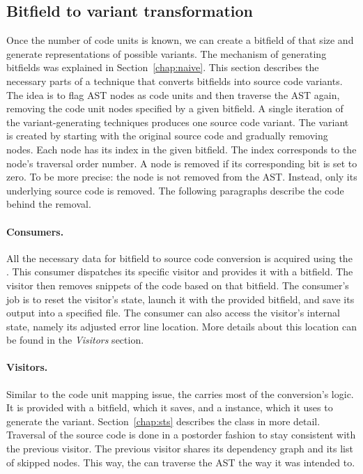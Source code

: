 \subsection*{Bitfield to variant transformation}

Once the number of code units is known, we can create a bitfield of that 
size and generate representations of possible variants. 
The mechanism of generating bitfields was explained in 
Section~\ref{chap:naive}. 
This section describes the necessary parts of a technique that converts 
bitfields into source code variants. 
The idea is to flag AST nodes as code units and then traverse the AST again, 
removing the code unit nodes specified by a given bitfield. 
A single iteration of the variant-generating techniques produces one source 
code variant. 
The variant is created by starting with the original source code and 
gradually removing nodes. 
Each node has its index in the given bitfield. 
The index corresponds to the node's traversal order number. 
A node is removed if its corresponding bit is set to zero. 
To be more precise: the node is not removed from the AST. 
Instead, only its underlying source code is removed. 
The following paragraphs describe the code behind the removal.

\paragraph{Consumers.} All the necessary data for bitfield to source code 
conversion is acquired using the . 
This consumer dispatches its specific visitor and provides it with 
a bitfield. 
The visitor then removes snippets of the code based on that bitfield.
The consumer's job is to reset the visitor's state, launch it with 
the provided bitfield, and save its output into a specified file. 
The consumer can also access the visitor's internal state, namely its 
adjusted error line location. 
More details about this location can be found in the \emph{Visitors} section.

\paragraph{Visitors.} Similar to the code unit mapping issue, 
the  carries most of the conversion's 
logic.
It is provided with a bitfield, which it saves, and a  
instance, which it uses to generate the variant.
Section~\ref{chap:sts} describes the  class in more detail.
Traversal of the source code is done in a postorder fashion to stay 
consistent with the previous visitor. 
The previous visitor shares its dependency graph and its list of skipped 
nodes.
This way, the  can traverse the AST the way 
it was intended to. 

